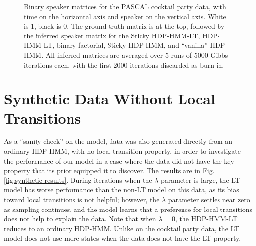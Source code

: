 \begin{figure}[tb]
\begin{center}
\caption{Binary speaker matrices for the PASCAL cocktail party data, with time on
  the horizontal axis and speaker on the vertical axis.  White is 1,
  black is 0.  The ground truth matrix is at the top, followed by the 
  inferred speaker matrix for the
  Sticky HDP-HMM-LT, HDP-HMM-LT, binary factorial, Sticky-HDP-HMM, and
  ``vanilla'' HDP-HMM.  All inferred matrices are averaged over 5 runs
  of 5000 Gibbs iterations each, with the first 2000 iterations
  discarded as burn-in. \label{fig:pascal-binary-matrices}}
\end{center}
\end{figure}

\section{Synthetic Data Without Local Transitions}
\label{sec:synth-data-without}

As a ``sanity check'' on the model, data was also generated 
directly from an ordinary HDP-HMM, with no local
transition property, in order to investigate the performance of our
model in a case where the data did not have the key property that its
prior equipped it to discover.  The results are in
Fig. \ref{fig:synthetic-results}.
During iterations when the $\lambda$ parameter is large, the LT model has worse
performance than the non-LT model on this data, as its bias toward
local transitions is not helpful; however, the
$\lambda$ parameter settles near zero as sampling continues, and the 
model learns that a preference for local transitions does not help to explain
the data.  Note that when $\lambda = 0$, the HDP-HMM-LT reduces to an ordinary HDP-HMM.
Unlike on the cocktail party data, the LT model does not use more
states when the data does not have the LT property.

